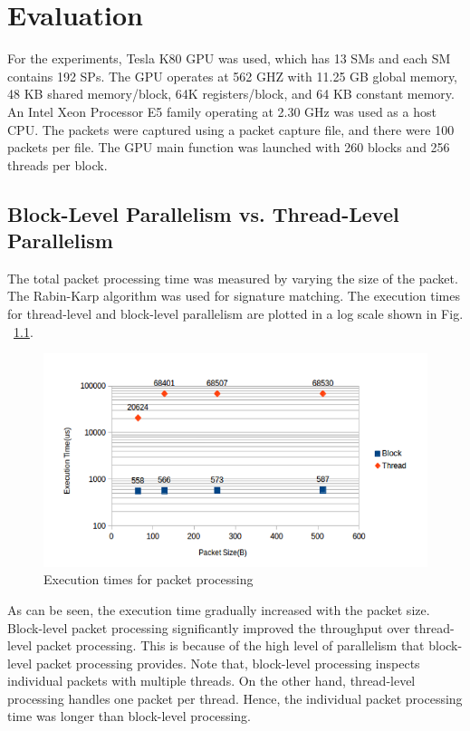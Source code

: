 \chapter{Evaluation}
For the experiments, Tesla K80 GPU was used, which has 13 SMs and each SM contains 192 SPs. The GPU operates at 562 GHZ with 11.25 GB global memory, 48 KB shared memory/block, 64K registers/block, and 64 KB constant memory. An Intel Xeon Processor E5 family operating at 2.30 GHz was used as a host CPU. The packets were captured using a packet capture file, and there were 100 packets per file. The GPU main function was launched with 260 blocks and 256 threads per block.

\section{Block-Level Parallelism vs. Thread-Level Parallelism}

The total packet processing time was measured by varying the size of the packet. The Rabin-Karp algorithm was used for signature matching. The execution times for thread-level and block-level parallelism are plotted in a log scale shown in Fig. ~\ref{fig:parallelism}. 

\begin{figure}[H]
	\centering
	\includegraphics[width=12cm]{parallelism.png}
	\caption{Execution times for packet processing}
	\label{fig:parallelism}
\end{figure}
\squeezeup

As can be seen, the execution time gradually increased with the packet size. Block-level packet processing significantly improved the throughput over thread-level packet processing. This is because of the high level of parallelism that block-level packet processing provides. Note that, block-level processing inspects individual packets with multiple threads. On the other hand, thread-level processing handles one packet per thread. Hence, the individual packet processing time was longer than block-level processing.

